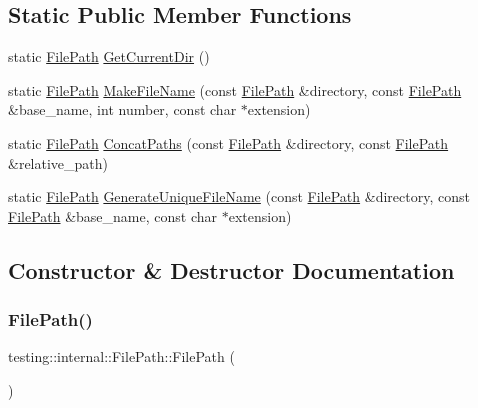 \subsection*{Static Public Member Functions}
\begin{DoxyCompactItemize}
\item 
static \mbox{\hyperlink{classtesting_1_1internal_1_1_file_path}{File\+Path}} \mbox{\hyperlink{classtesting_1_1internal_1_1_file_path_a0f7b48e493656679cb82a2b679620c4e}{Get\+Current\+Dir}} ()
\item 
static \mbox{\hyperlink{classtesting_1_1internal_1_1_file_path}{File\+Path}} \mbox{\hyperlink{classtesting_1_1internal_1_1_file_path_a1e7793eaae21c6629afe8be11064b111}{Make\+File\+Name}} (const \mbox{\hyperlink{classtesting_1_1internal_1_1_file_path}{File\+Path}} \&directory, const \mbox{\hyperlink{classtesting_1_1internal_1_1_file_path}{File\+Path}} \&base\+\_\+name, int number, const char $\ast$extension)
\item 
static \mbox{\hyperlink{classtesting_1_1internal_1_1_file_path}{File\+Path}} \mbox{\hyperlink{classtesting_1_1internal_1_1_file_path_ad58aa6d8b160d0ba0b661f56f0980e26}{Concat\+Paths}} (const \mbox{\hyperlink{classtesting_1_1internal_1_1_file_path}{File\+Path}} \&directory, const \mbox{\hyperlink{classtesting_1_1internal_1_1_file_path}{File\+Path}} \&relative\+\_\+path)
\item 
static \mbox{\hyperlink{classtesting_1_1internal_1_1_file_path}{File\+Path}} \mbox{\hyperlink{classtesting_1_1internal_1_1_file_path_ab22637ea53e3918ec814dc6a5fecd1f9}{Generate\+Unique\+File\+Name}} (const \mbox{\hyperlink{classtesting_1_1internal_1_1_file_path}{File\+Path}} \&directory, const \mbox{\hyperlink{classtesting_1_1internal_1_1_file_path}{File\+Path}} \&base\+\_\+name, const char $\ast$extension)
\end{DoxyCompactItemize}


\subsection{Constructor \& Destructor Documentation}
\mbox{\label{classtesting_1_1internal_1_1_file_path_a3504a51accbca78a52fe586133ea5499}} 
\subsubsection{\texorpdfstring{FilePath()}{FilePath()}\hspace{0.1cm}{\footnotesize\ttfamily [1/3]}}
{\footnotesize\ttfamily testing\+::internal\+::\+File\+Path\+::\+File\+Path (\begin{DoxyParamCaption}{ }\end{DoxyParamCaption})\hspace{0.3cm}{\ttfamily [inline]}}

